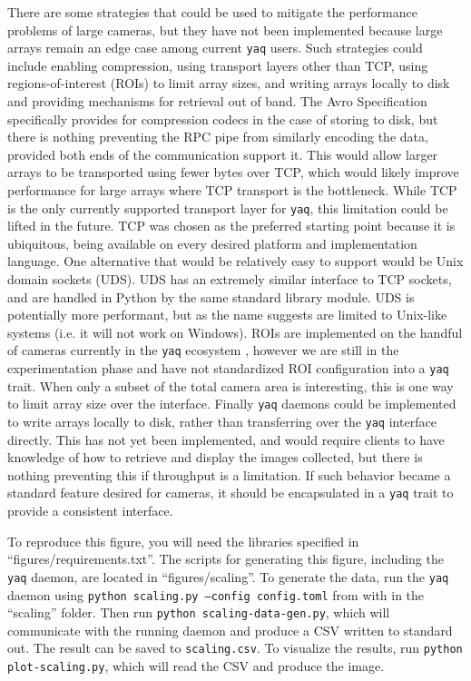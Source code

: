 \documentclass[11pt, full]{article}
\newcommand\yaq{\texttt{yaq}}
\begin{document}
There are some strategies that could be used to mitigate the performance problems of large cameras, but they have not been implemented because large arrays remain an edge case among current \yaq{} users.
Such strategies could include enabling compression, using transport layers other than TCP, using regions-of-interest (ROIs) to limit array sizes, and writing arrays locally to disk and providing mechanisms for retrieval out of band.
The Avro Specification \cite{AvroSpecification} specifically provides for compression codecs in the case of storing to disk, but there is nothing preventing the RPC pipe from similarly encoding the data, provided both ends of the communication support it.
This would allow larger arrays to be transported using fewer bytes over TCP, which would likely improve performance for large arrays where TCP transport is the bottleneck.
While TCP is the only currently supported transport layer for \yaq{}, this limitation could be lifted in the future.
TCP was chosen as the preferred starting point because it is ubiquitous, being available on every desired platform and implementation language.
One alternative that would be relatively easy to support would be Unix domain sockets (UDS).
UDS has an extremely similar interface to TCP sockets, and are handled in Python by the same standard library module.
UDS is potentially more performant, but as the name suggests are limited to Unix-like systems (i.e. it will not work on Windows).
ROIs are implemented on the handful of cameras currently in the \yaq{} ecosystem \cite{yaqd_andor,yaqd_pi}, however we are still in the experimentation phase and have not standardized ROI configuration into a \yaq{} trait.
When only a subset of the total camera area is interesting, this is one way to limit array size over the interface.
Finally \yaq{} daemons could be implemented to write arrays locally to disk, rather than transferring over the \yaq{} interface directly.
This has not yet been implemented, and would require clients to have knowledge of how to retrieve and display the images collected, but there is nothing preventing this if throughput is a limitation.
If such behavior became a standard feature desired for cameras, it should be encapsulated in a \yaq{} trait to provide a consistent interface.

To reproduce this figure, you will need the libraries specified in ``figures/requirements.txt''.
The scripts for generating this figure, including the \yaq{} daemon, are located in ``figures/scaling''.
To generate the data, run the \yaq{} daemon using \texttt{python scaling.py --config config.toml} from with in the ``scaling'' folder.
Then run \texttt{python scaling-data-gen.py}, which will communicate with the running daemon and produce a CSV written to standard out.
The result can be saved to \texttt{scaling.csv}.
To visualize the results, run \texttt{python plot-scaling.py}, which will read the CSV and produce the image.
\end{document}
